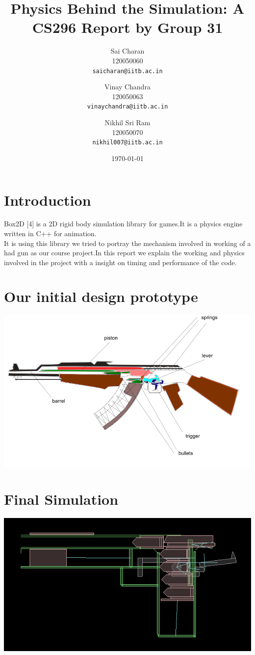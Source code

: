 \documentclass[11pt]{article}
\title{Physics Behind the Simulation: A CS296 Report by Group 31}
\author{Sai Charan\\
  120050060\\
  \texttt{saicharan@iitb.ac.in}\and
  Vinay Chandra\\
  120050063\\
  \texttt{vinaychandra@iitb.ac.in}\and
  Nikhil Sri Ram\\
  120050070\\
  \texttt{nikhil007@iitb.ac.in}\\
}
\date{\today}
\begin{document}
\maketitle
\section{Introduction}
Box2D [4] is a 2D rigid body simulation library for games.It is a physics engine written in C++ for animation.\\
It is using this library we tried to portray the mechanism involved in working of a had gun as our course project.In this report we explain the working and physics involved in the project with a insight on timing and performance of the code.
\section{Our initial design prototype}
\begin{center}
\includegraphics[scale=0.7]{../details/images/2.png}
\end{center}
\section{Final Simulation}
\begin{center}
\includegraphics[scale=0.7]{../details/images/gun.png}
\end{center}
\end{document}
